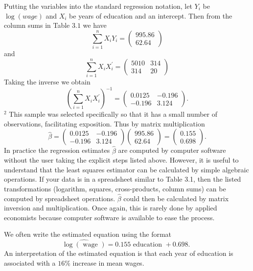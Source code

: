\documentclass[10pt]{article}
\begin{document}
Putting the variables into the standard regression notation, let $Y_{i}$ be $\log (w a g e)$ and $X_{i}$ be years of education and an intercept. Then from the column sums in Table $3.1$ we have
$$
\sum_{i=1}^{n} X_{i} Y_{i}=\left(\begin{array}{c}
995.86 \\
62.64
\end{array}\right)
$$
and
$$
\sum_{i=1}^{n} X_{i} X_{i}^{\prime}=\left(\begin{array}{cc}
5010 & 314 \\
314 & 20
\end{array}\right)
$$
Taking the inverse we obtain
$$
\left(\sum_{i=1}^{n} X_{i} X_{i}^{\prime}\right)^{-1}=\left(\begin{array}{cc}
0.0125 & -0.196 \\
-0.196 & 3.124
\end{array}\right) .
$$
${ }^{2}$ This sample was selected specifically so that it has a small number of observations, facilitating exposition. Thus by matrix multiplication
$$
\widehat{\beta}=\left(\begin{array}{cc}
0.0125 & -0.196 \\
-0.196 & 3.124
\end{array}\right)\left(\begin{array}{c}
995.86 \\
62.64
\end{array}\right)=\left(\begin{array}{c}
0.155 \\
0.698
\end{array}\right) .
$$
In practice the regression estimates $\widehat{\beta}$ are computed by computer software without the user taking the explicit steps listed above. However, it is useful to understand that the least squares estimator can be calculated by simple algebraic operations. If your data is in a spreadsheet similar to Table 3.1, then the listed transformations (logarithm, squares, cross-products, column sums) can be computed by spreadsheet operations. $\widehat{\beta}$ could then be calculated by matrix inversion and multiplication. Once again, this is rarely done by applied economists because computer software is available to ease the process.

We often write the estimated equation using the format
$$
\widehat{\log (\text { wage })}=0.155 \text { education }+0.698 \text {. }
$$
An interpretation of the estimated equation is that each year of education is associated with a $16 \%$ increase in mean wages.
\end{document}
